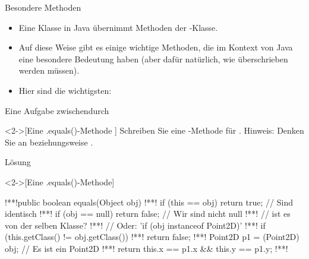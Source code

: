 \begin{frame}[fragile]{Besondere Methoden}
\begin{itemize}[<+(1)->]
    \item Eine Klasse in Java übernimmt Methoden der -Klasse.
    \item Auf diese Weise gibt es einige wichtige Methoden,\pause{} die im Kontext von Java eine besondere Bedeutung haben\pause{} (aber dafür natürlich, wie  überschrieben werden müssen).
    \item Hier sind die wichtigsten: 
\end{itemize}
\end{frame}

\ifull
\begin{frame}[c]{Eine Aufgabe zwischendurch}
    \begin{exercise}<2->[Eine .equals()-Methode ]
        Schreiben Sie eine -Methode für .\pause{} Hinweis: Denken Sie an  beziehungsweise .
    \end{exercise}
\end{frame}

\begin{frame}[c,fragile]{Lösung}
    \begin{solve}<2->[Eine .equals()-Methode]
\begin{plainjava}
!**!public boolean equals(Object obj) {
!**!    if (this == obj) return true; // Sind identisch
!**!    if (obj == null) return false; // Wir sind nicht null
!**!    // ist es von der selben Klasse?
!**!    // Oder: 'if (obj instanceof Point2D)'
!**!    if (this.getClass() != obj.getClass())
!**!        return false;
!**!    Point2D p1 = (Point2D) obj; // Es ist ein Point2D
!**!    return this.x == p1.x && this.y == p1.y;
!**!}
\end{plainjava}
    \end{solve}
\end{frame}
\fi


